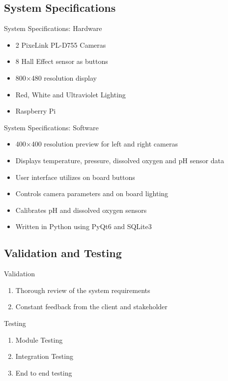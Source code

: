 \documentclass[17pt, aspectratio=169]{beamer}
\begin{document}
\subsection*{System Specifications}
\begin{frame}{System Specifications: Hardware}
	\begin{itemize}
		\item 2 PixeLink PL-D755 Cameras
		\item 8 Hall Effect sensor as buttons
		\item 800$\times$480 resolution display
		\item Red, White and Ultraviolet Lighting
		\item Raspberry Pi
	\end{itemize}
\end{frame}
\begin{frame}{System Specifications: Software}
	\begin{itemize}
		\item 400$\times$400 resolution preview for left and right cameras
		\item Displays temperature, pressure, dissolved oxygen and pH sensor data
		\item User interface utilizes on board buttons
		\item Controls camera parameters and on board lighting
		\item Calibrates pH and dissolved oxygen sensors
		\item Written in Python using PyQt6 and SQLite3
	\end{itemize}
\end{frame}
\subsection*{Validation and Testing}
\begin{frame}{Validation}
	\begin{enumerate}
		\item Thorough review of the system requirements
		\item Constant feedback from the client and stakeholder
	\end{enumerate}
\end{frame}
\begin{frame}{Testing}
	\begin{enumerate}
		\item Module Testing
		\item Integration Testing
		\item End to end testing
	\end{enumerate}
\end{frame}
\end{document}
